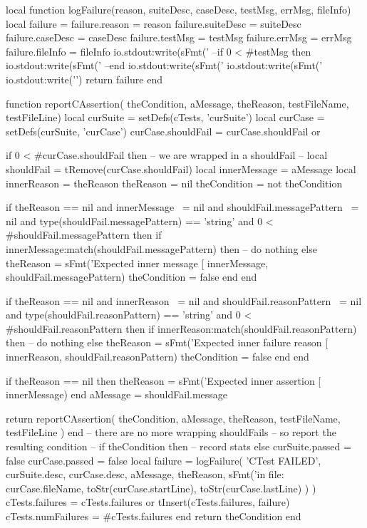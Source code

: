 local function logFailure(reason, suiteDesc, caseDesc,
                          testMsg, errMsg, fileInfo)
  local failure = {}
  failure.reason    = reason
  failure.suiteDesc = suiteDesc
  failure.caseDesc  = caseDesc
  failure.testMsg   = testMsg
  failure.errMsg    = errMsg
  failure.fileInfo  = fileInfo
  io.stdout:write(sFmt('    %
  --if 0 < #testMsg then
    io.stdout:write(sFmt('    %
  --end
  io.stdout:write(sFmt('    %
  io.stdout:write(sFmt('    %
  io.stdout:write('\n\n')
  return failure
end

function reportCAssertion(
  theCondition, aMessage, theReason,
  testFileName, testFileLine)
  local curSuite     = setDefs(cTests, 'curSuite')
  local curCase      = setDefs(curSuite, 'curCase')
  curCase.shouldFail = curCase.shouldFail or { }
  
  if 0 < #curCase.shouldFail then
    -- we are wrapped in a shouldFail
    --
    local shouldFail   = tRemove(curCase.shouldFail)
    local innerMessage = aMessage
    local innerReason  = theReason
    theReason          = nil
    theCondition       = not theCondition
  
    if theReason == nil
      and innerMessage ~= nil
      and shouldFail.messagePattern ~= nil
      and type(shouldFail.messagePattern) == 'string'
      and 0 < #shouldFail.messagePattern then
      if innerMessage:match(shouldFail.messagePattern) then
        -- do nothing
      else
        theReason = sFmt('Expected inner message [%
          innerMessage, shouldFail.messagePattern)
        theCondition = false
      end
    end

    if theReason == nil
      and innerReason ~= nil
      and shouldFail.reasonPattern ~= nil
      and type(shouldFail.reasonPattern) == 'string'
      and 0 < #shouldFail.reasonPattern then
      if innerReason:match(shouldFail.reasonPattern) then
        -- do nothing
      else
        theReason = sFmt('Expected inner failure reason [%
          innerReason, shouldFail.reasonPattern)
        theCondition = false
      end
    end
    
    if theReason == nil then
      theReason = sFmt('Expected inner assertion [%
        innerMessage)
    end
    aMessage = shouldFail.message
    
    return reportCAssertion(
      theCondition,
      aMessage,
      theReason,
      testFileName,
      testFileLine
    )
  end
  -- there are no more wrapping shouldFails
  -- so report the resulting condition
  --
  if theCondition then
    -- record stats
  else
    curSuite.passed = false
    curCase.passed  = false
    local failure = logFailure(
      'CTest FAILED',
      curSuite.desc,
      curCase.desc,
      aMessage,
      theReason,
      sFmt('in file: %
        curCase.fileName,
        toStr(curCase.startLine),
        toStr(curCase.lastLine)
      )
    )
    cTests.failures = cTests.failures or { }
    tInsert(cTests.failures, failure)
    cTests.numFailures = #cTests.failures
  end
  return theCondition
end

